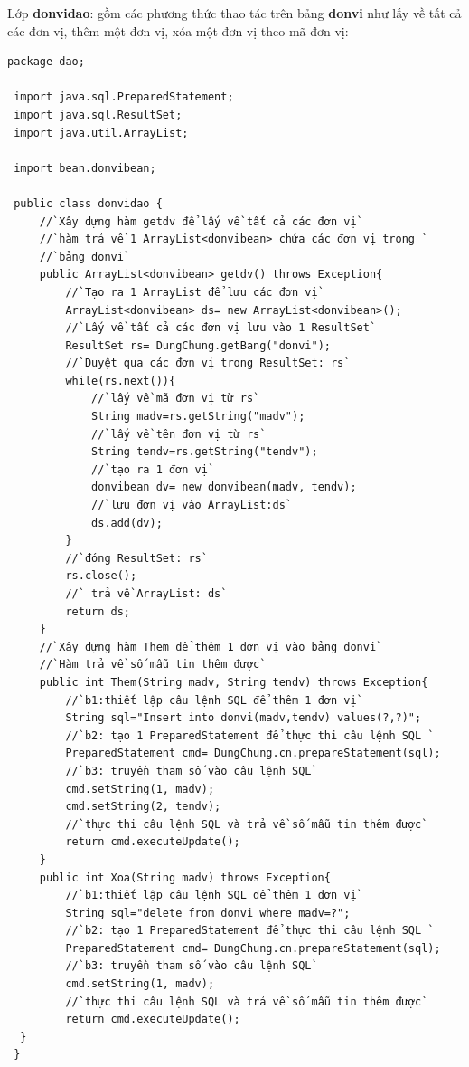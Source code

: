  Lớp \textbf{donvidao}: gồm các phương thức thao tác trên bảng \textbf{donvi} như lấy về tất cả các đơn vị, thêm một đơn vị, xóa một đơn vị theo mã đơn vị:
 \begin{lstlisting}[escapechar=`]
 package dao;
 
 import java.sql.PreparedStatement;
 import java.sql.ResultSet;
 import java.util.ArrayList;
 
 import bean.donvibean;
 
 public class donvidao {
	 //`Xây dựng hàm getdv để lấy về tất cả các đơn vị`
	 //`hàm trả về 1 ArrayList<donvibean> chứa các đơn vị trong `
	 //`bảng donvi`
	 public ArrayList<donvibean> getdv() throws Exception{
		 //`Tạo ra 1 ArrayList để lưu các đơn vị`
		 ArrayList<donvibean> ds= new ArrayList<donvibean>();
		 //`Lấy về tất cả các đơn vị lưu vào 1 ResultSet`
		 ResultSet rs= DungChung.getBang("donvi");
		 //`Duyệt qua các đơn vị trong ResultSet: rs`
		 while(rs.next()){
			 //`lấy về mã đơn vị từ rs`
			 String madv=rs.getString("madv");
			 //`lấy về tên đơn vị từ rs`
			 String tendv=rs.getString("tendv");
			 //`tạo ra 1 đơn vị`
			 donvibean dv= new donvibean(madv, tendv);
			 //`lưu đơn vị vào ArrayList:ds`
			 ds.add(dv);
		 } 
		 //`đóng ResultSet: rs`
		 rs.close();
		 //` trả về ArrayList: ds`
		 return ds;
	 }
	 //`Xây dựng hàm Them để thêm 1 đơn vị vào bảng donvi`	
	 //`Hàm trả về số mẫu tin thêm được`
	 public int Them(String madv, String tendv) throws Exception{
		 //`b1:thiết lập câu lệnh SQL để thêm 1 đơn vị`
		 String sql="Insert into donvi(madv,tendv) values(?,?)";
		 //`b2: tạo 1 PreparedStatement để thực thi câu lệnh SQL `
		 PreparedStatement cmd= DungChung.cn.prepareStatement(sql);
		 //`b3: truyền tham số vào câu lệnh SQL`
		 cmd.setString(1, madv);
		 cmd.setString(2, tendv);
		 //`thực thi câu lệnh SQL và trả về số mẫu tin thêm được`
		 return cmd.executeUpdate();
	 }
	 public int Xoa(String madv) throws Exception{
		 //`b1:thiết lập câu lệnh SQL để thêm 1 đơn vị`
		 String sql="delete from donvi where madv=?";
		 //`b2: tạo 1 PreparedStatement để thực thi câu lệnh SQL `
		 PreparedStatement cmd= DungChung.cn.prepareStatement(sql);
		 //`b3: truyền tham số vào câu lệnh SQL`
		 cmd.setString(1, madv);
		 //`thực thi câu lệnh SQL và trả về số mẫu tin thêm được`
		 return cmd.executeUpdate();
  }
 }
 
 \end{lstlisting}
 
